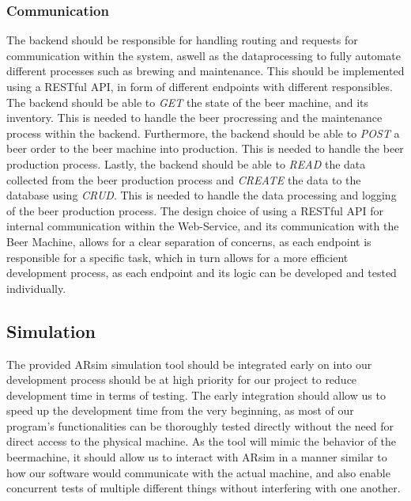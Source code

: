 \subsubsection{Communication}
The backend should be responsible for handling routing and requests for communication within the system, aswell as the dataprocessing to fully automate different processes such as brewing and maintenance. This should be implemented using a RESTful API, in form of different endpoints with different responsibles. \newline 
The backend should be able to \textit{GET} the state of the beer machine, and its inventory. This is needed to handle the beer procressing and the maintenance process within the backend.\newline
Furthermore, the backend should be able to \textit{POST} a beer order to the beer machine into production. This is needed to handle the beer production process.\newline
Lastly, the backend should be able to \textit{READ} the data collected from the beer production process and \textit{CREATE} the data to the database using \textit{CRUD}. This is needed to handle the data processing and logging of the beer production process.
The design choice of using a RESTful API for internal communication within the Web-Service, and its communication with the Beer Machine, allows for a clear separation of concerns, as each endpoint is responsible for a specific task, which in turn allows for a more efficient development process, as each endpoint and its logic can be developed and tested individually.

\subsection{Simulation}
The provided ARsim simulation tool should be integrated early on into our development process should be at high priority for our project to reduce development time in terms of testing. 
The early integration should allow us to speed up the development time from the very beginning, as most of our program's functionalities can be thoroughly tested directly without the need for direct access to the physical machine.
As the tool will mimic the behavior of the beermachine, it should allow us to interact with ARsim in a manner similar to how our software would communicate with the actual machine, and also enable concurrent tests of multiple different things without interfering with one another.

